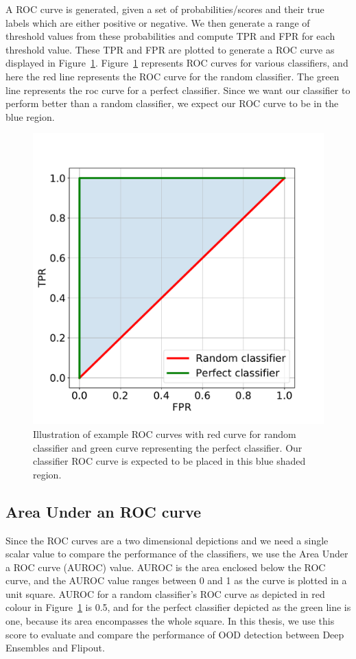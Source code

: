 A ROC curve is generated, given a set of probabilities/scores and their true labels which are either positive or negative.
We then generate a range of threshold values from these probabilities and compute TPR and FPR for each threshold value.
These TPR and FPR are plotted to generate a ROC curve as displayed in Figure~\ref{fig:ROC_curve_example}. 
Figure~\ref{fig:ROC_curve_example} represents ROC curves for various classifiers, and here the red line represents the ROC curve for the random classifier. The green line represents the roc curve for a perfect classifier.
Since we want our classifier to perform better than a random classifier, we expect our ROC curve to be in the blue region.
\begin{figure}[!ht]
    \centering
    \includegraphics[scale=0.35]{images/ROC_curve_example.pdf}
    \caption{Illustration of example ROC curves with red curve for random classifier and green curve representing the perfect classifier.
    Our classifier ROC curve is expected to be placed in this blue shaded region.}
    \label{fig:ROC_curve_example}
\end{figure}

\subsection{Area Under an ROC curve}
Since the ROC curves are a two dimensional depictions and we need a single scalar value to compare the performance of the classifiers, we use the Area Under a ROC curve (AUROC) value.
AUROC is the area enclosed below the ROC curve, and the AUROC value ranges between 0 and 1 as the curve is plotted in a unit square.
AUROC for a random classifier's ROC curve as depicted in red colour in Figure~\ref{fig:ROC_curve_example} is 0.5, and for the perfect classifier depicted as the green line is one, because its area encompasses the whole square.
In this thesis, we use this score to evaluate and compare the performance of OOD detection between Deep Ensembles and Flipout.


